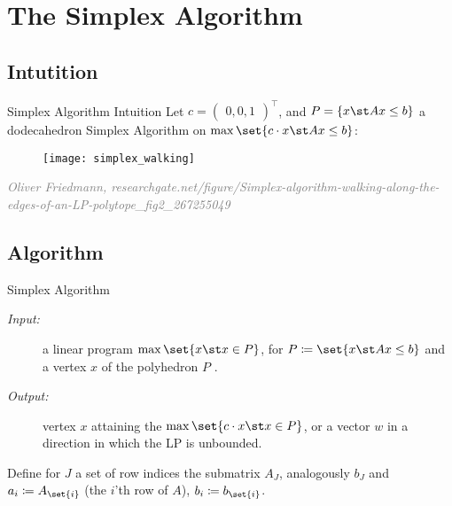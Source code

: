 \documentclass[a4paper, x11names, svgnames]{beamer}
\theoremstyle{definition}
\theoremstyle{plain}
\theoremstyle{plain}
\begin{document}
\section[Simplex]{The Simplex Algorithm}
\subsection{Intutition}
\begin{frame}{Simplex Algorithm Intuition}
    Let $c=\begin{pmatrix*}0,0,1\end{pmatrix*}^\top$, and $P=\{x\st Ax\leq b\}$ a dodecahedron
    Simplex Algorithm on $\max\set{c\cdot x \st Ax \leq b}$:

    \begin{figure}
        \center
        \texttt{[image: simplex\_walking]}
    \end{figure}
    \center\vfill\tiny\textit{\textcolor{gray}{Oliver Friedmann, researchgate.net/figure/Simplex-algorithm-walking-along-the-edges-of-an-LP-polytope\_fig2\_267255049}}
\end{frame}

\subsection{Algorithm}
\begin{frame}{Simplex Algorithm}
    \begin{description}
        \item[\textit{Input:}] a linear program $\max\set{x\st x\in P}$, for  $P\coloneqq \set{x\st Ax \leq b}$ and a vertex $x$ of the polyhedron $P$ . \\
        \item[\textit{Output:}] vertex $x$ attaining the $\max\set{c\cdot x \st x\in P}$, or a vector $w$ in a direction in which the LP is unbounded.  \\
    \end{description}
    \vspace{0.6cm}
    Define for $J$ a set of row indices the submatrix $A_J$, analogously $b_J$ and $a_i \coloneqq A_{\set{i}}$ (the $i$'th row of $A$), $b_{i}\coloneqq b_{\set{i}}$.
\end{frame}
\end{document}
